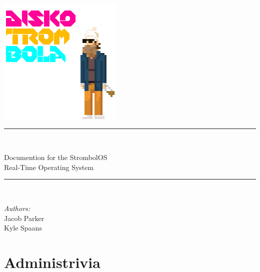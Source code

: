\documentclass{article}
\newcommand{\HRule}{\rule{\linewidth}{0.5mm}}
\begin{document}
\begin{titlepage}
\phantom{.}
\vspace{50pt}
\begin{center} 
\includegraphics{gstrombo}
\vspace{15pt}\\
\HRule \\[0.4cm]
\renewcommand*\familydefault{\sfdefault} 

{\huge \bfseries 

{        
        
\renewcommand*\rmdefault{helvet}\normalfont\upshape\sffamily
Documention for the {\sc StrombolOS}\texttrademark \\
\vspace{10pt}
Real-Time Operating System}
\vspace{12pt}


}


\HRule \\[1.5cm]
\end{center}
\begin{minipage}{0.4\textwidth}
\begin{flushleft} \large
\emph{Authors:}\\
Jacob Parker\\
Kyle Spaans
\end{flushleft}
\end{minipage}
\end{titlepage}


\tableofcontents
\pagebreak









\setcounter{section}{-4}
\section{Administrivia}
\end{document}
